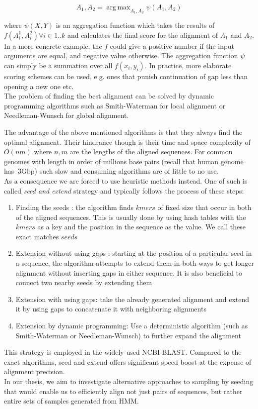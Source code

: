 $$A_1, A_2 = \operatorname{arg\,max}_{A_1, A_2} \psi(A_1, A_2)$$

where $\psi(X,Y)$ is an aggregation function which takes the results of $f(A_i^1,A_i^2) \forall i \in {1..k}$ and calculates the final score for the alignment of $A_1$ and $A_2$.\\

In a more concrete example, the $f$ could give a positive number if the input arguments are equal, and negative value otherwise. The aggregation function $\psi$ can simply be a summation over all $f(x_i, y_i)$. In practice, more elaborate scoring schemes can be used, e.g. ones that punish continuation of gap less than opening a new one etc.\\ 

The problem of finding the best alignment can be solved by dynamic programming algorithms such as Smith-Waterman for local alignment or Needleman-Wunsch for global alignment.

The advantage of the above mentioned algorithms is that they always find the optimal alignment. Their hindrance though is their time and space complexity of $O(nm)$ where $n,m$ are the lengths of the aligned sequences. For common genomes with length in order of millions base pairs (recall that human genome has $~$3Gbp) such slow and consuming algorithms are of little to no use.\\

As a consequence we are forced to use heuristic methods instead. One of such is called \emph{seed and extend} strategy and typically follows the process of these steps:
\begin{enumerate}
	\item{Finding the seeds : the algorithm finds $kmers$ of fixed size that occur in both of the aligned sequences. This is usually done by using hash tables with the $kmers$ as a key and the position in the sequence as the value. We call these exact matches $seeds$}
	\item{Extension without using gaps : starting at the position of a particular seed in a sequence, the algorithm attempts to extend them in both ways to get longer alignment without inserting gaps in either sequence. It is also beneficial to connect two nearby seeds by extending them}
	\item{Extension with using gaps: take the already generated alignment and extend it by using gaps to concatenate it with neighboring alignments}
	\item{Extension by dynamic programming: Use a deterministic algorithm (such as Smith-Waterman or Needleman-Wunsch) to further expand the alignment}
\end{enumerate}

This strategy is employed in the widely-used NCBI-BLAST. Compared to the exact algorithms, seed and extend offers significant speed boost at the expense of alignment precision.\\

In our thesis, we aim to investigate alternative approaches to sampling by seeding that would enable us to efficiently align not just pairs of sequences, but rather entire sets of samples generated from HMM.
